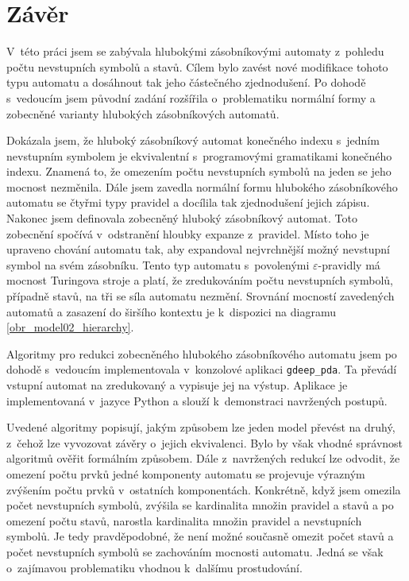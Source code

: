 \chapter{Závěr}

V~této práci jsem se zabývala hlubokými zásobníkovými automaty z~pohledu počtu nevstupních symbolů a stavů. Cílem bylo zavést nové modifikace tohoto typu automatu a dosáhnout tak jeho částečného zjednodušení. Po dohodě s~vedoucím jsem původní zadání rozšířila o~problematiku normální formy a zobecněné varianty hlubokých zásobníkových automatů.

Dokázala jsem, že hluboký zásobníkový automat konečného indexu s~jedním nevstupním symbolem je ekvivalentní s~programovými gramatikami konečného indexu. Znamená to, že omezením počtu nevstupních symbolů na jeden se jeho mocnost nezměnila.  Dále jsem zavedla normální formu hlubokého zásobníkového automatu se čtyřmi typy pravidel a docílila tak zjednodušení jejich zápisu. Nakonec jsem definovala zobecněný hluboký zásobníkový automat. Toto zobecnění spočívá v~odstranění hloubky expanze z~pravidel. Místo toho je upraveno chování automatu tak, aby expandoval nejvrchnější možný nevstupní symbol na svém zásobníku. Tento typ automatu s~povolenými $\varepsilon$-pravidly má mocnost Turingova stroje a platí, že zredukováním počtu nevstupních symbolů, případně stavů, na tři se síla automatu nezmění. Srovnání mocností zavedených automatů a zasazení do širšího kontextu je k~dispozici na diagramu \ref{obr_model02_hierarchy}.


Algoritmy pro redukci zobecněného hlubokého zásobníkového automatu jsem po dohodě s~vedoucím implementovala v~konzolové aplikaci \texttt{gdeep\_pda}. Ta převádí vstupní automat na zredukovaný a vypisuje jej na výstup. Aplikace je implementovaná v~jazyce Python a slouží k~demonstraci navržených postupů. 

Uvedené algoritmy popisují, jakým způsobem lze jeden model převést na druhý, z~čehož lze vyvozovat závěry o~jejich ekvivalenci. Bylo by však vhodné  správnost algoritmů ověřit formálním způsobem. Dále z~navržených redukcí lze odvodit, že omezení počtu prvků jedné komponenty automatu se projevuje výrazným zvýšením počtu prvků v~ostatních komponentách. Konkrétně, když jsem omezila počet nevstupních symbolů, zvýšila se kardinalita množin pravidel a stavů a po omezení počtu stavů, narostla kardinalita množin pravidel a nevstupních symbolů. Je tedy pravděpodobné, že není možné současně omezit počet stavů a počet nevstupních symbolů se zachováním mocnosti automatu. Jedná se však o~zajímavou problematiku vhodnou k~dalšímu prostudování.



